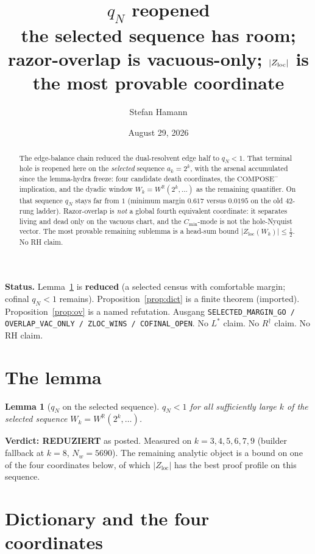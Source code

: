 \documentclass[11pt]{article}
\title{\bfseries $q_N$ reopened\\[2mm]
\large the selected sequence has room;
razor-overlap is vacuous-only;
$\lvert\Zloc\rvert$ is the most provable coordinate}
\author{Stefan Hamann}
\date{August 29, 2026}
\newtheorem{lemma}{Lemma}
\theoremstyle{remark}
\newcommand{\Zloc}{Z_{\mathrm{loc}}}
\begin{document}
\maketitle

\begin{abstract}\noindent
The edge-balance chain reduced the dual-resolvent
edge half to $q_N<1$.
That terminal hole is reopened here on the
\emph{selected} sequence $a_k=2^k$, with the
arsenal accumulated since the lemma-hydra freeze:
four candidate death coordinates, the
$\mathrm{COMPOSE}^{-}$ implication, and the
dyadic window $W_k=W^{\mathbb{R}}(2^k,\ldots)$
as the remaining quantifier.
On that sequence $q_N$ stays far from $1$
(minimum margin $0.617$ versus $0.0195$ on the
old $42$-rung ladder).
Razor-overlap is \emph{not} a global fourth
equivalent coordinate: it separates living and
dead only on the vacuous chart, and the
$C_{\min}$-mode is not the hole-Nyquist vector.
The most provable remaining sublemma is a
head-sum bound $\lvert\Zloc(W_k)\rvert\le\tfrac12$.
No RH claim.
\end{abstract}

\medskip\noindent
\textbf{Status.}\enspace
Lemma~\ref{lem:qn} is \textbf{reduced}
(a selected census with comfortable margin;
cofinal $q_N<1$ remains).
Proposition~\ref{prop:dict} is a finite theorem
(imported).
Proposition~\ref{prop:ov} is a named refutation.
Ausgang
\texttt{SELECTED\_MARGIN\_GO / OVERLAP\_VAC\_ONLY / ZLOC\_WINS / COFINAL\_OPEN}.
No $L^{*}$ claim.  No $R^{\dagger}$ claim.  No RH claim.

\section{The lemma}\label{sec:lem}

\begin{lemma}[$q_N$ on the selected sequence]\label{lem:qn}
$q_N<1$ for all sufficiently large $k$ of the
selected sequence $W_k=W^{\mathbb{R}}(2^k,\ldots)$.
\end{lemma}

\noindent
\textbf{Verdict: REDUZIERT} as posted.
Measured on $k=3,4,5,6,7,9$ (builder fallback
at $k=8$, $N_w=5690$).
The remaining analytic object is a bound on
one of the four coordinates below, of which
$\lvert\Zloc\rvert$ has the best proof profile
on this sequence.

\section{Dictionary and the four coordinates}\label{sec:four}
\end{document}
